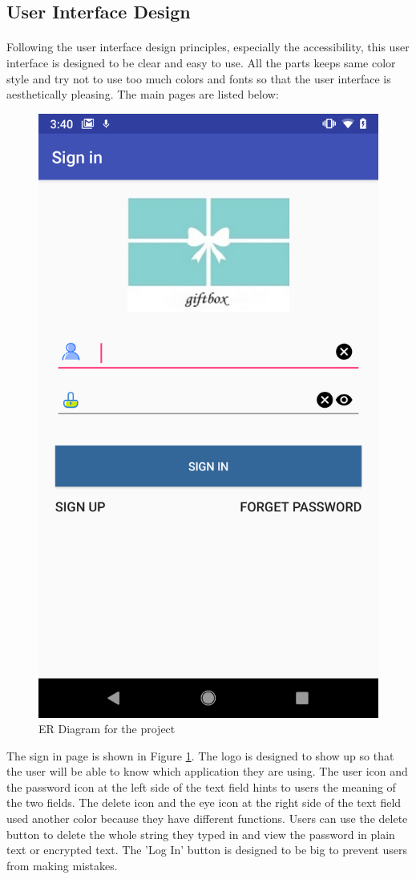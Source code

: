 \subsection{User Interface Design}
\paragraph{}Following the user interface design principles, especially the accessibility, this user interface is designed to be clear and easy to use. All the parts keeps same color style and try not to use too much colors and fonts so that the user interface is aesthetically pleasing. The main pages are listed below:
\begin{figure}[htb]
\centering
\includegraphics[width=.5\textwidth]{section03/assets/SignIn.png}
\caption[Short Caption 2]{\label{SignInUI}ER Diagram for the project}
\end{figure}
\par The sign in page is shown in Figure \ref{SignInUI}. The logo is designed to show up so that the user will be able to know which application they are using. The user icon and the password icon at the left side of the text field hints to users the meaning of the two fields. The delete icon and the eye icon at the right side of the text field used another color because they have different functions. Users can use the delete button to delete the whole string they typed in and view the password in plain text or encrypted text. The 'Log In' button is designed to be big to prevent users from making mistakes. 

